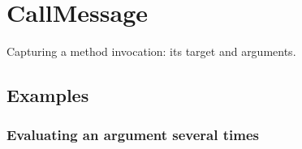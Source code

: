\section{CallMessage}
Capturing a method invocation: its target and arguments.

\subsection{Examples}
\subsubsection{Evaluating an argument several times}
\label{sec:std-callmsg-examples-several}

